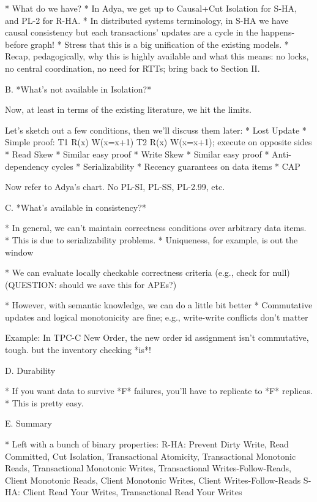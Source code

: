 * What do we have?
	* In Adya, we get up to Causal+Cut Isolation for S-HA, and PL-2 for R-HA.
	* In distributed systems terminology, in S-HA we have causal consistency but each transactions' updates are a cycle in the happens-before graph!
		* Stress that this is a big unification of the existing models.
	* Recap, pedagogically, why this is highly available and what this means: no locks, no central coordination, no need for RTTs; bring back to Section II.

B. *What's not available in Isolation?*

Now, at least in terms of the existing literature, we hit the limits.

Let's sketch out a few conditions, then we'll discuss them later:
* Lost Update
	* Simple proof: T1 R(x) W(x=x+1) T2 R(x) W(x=x+1); execute on opposite sides 
* Read Skew
	* Similar easy proof
* Write Skew
	* Similar easy proof
* Anti-dependency cycles
	* Serializability
* Recency guarantees on data items
	* CAP

Now refer to Adya's chart. No PL-SI, PL-SS, PL-2.99, etc.

C. *What's available in consistency?*

* In general, we can't maintain correctness conditions over arbitrary data items.
	* This is due to serializability problems.
	* Uniqueness, for example, is out the window

* We can evaluate locally checkable correctness criteria (e.g., check for null)
	(QUESTION: should we save this for APEs?)

* However, with semantic knowledge, we can do a little bit better
	* Commutative updates and logical monotonicity are fine; e.g., write-write conflicts don't matter
	
Example: In TPC-C New Order, the new order id assignment isn't commutative, tough. but the inventory checking *is*!

D. Durability

* If you want data to survive *F* failures, you'll have to replicate to *F* replicas.
	* This is pretty easy.

E. Summary

* Left with a bunch of binary properties: 
R-HA: Prevent Dirty Write, Read Committed, Cut Isolation, Transactional Atomicity, Transactional Monotonic Reads, Transactional Monotonic Writes, Transactional Writes-Follow-Reads, Client Monotonic Reads, Client Monotonic Writes, Client Writes-Follow-Reads
S-HA: Client Read Your Writes, Transactional Read Your Writes

